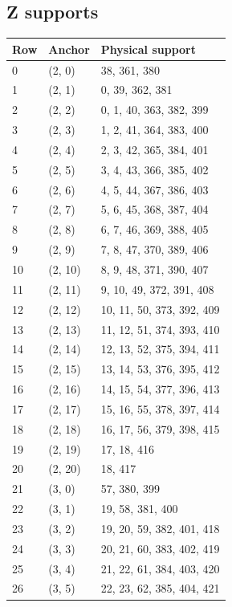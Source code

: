 \documentclass{article}
\begin{document}
\subsection{Z supports}\label{sec:z-supports}

\begin{longtable}{lll}
  Row & Anchor & Physical support \\
  \hline
  \endhead
  0 & (2, 0) & 38, 361, 380 \\
  1 & (2, 1) & 0, 39, 362, 381 \\
  2 & (2, 2) & 0, 1, 40, 363, 382, 399 \\
  3 & (2, 3) & 1, 2, 41, 364, 383, 400 \\
  4 & (2, 4) & 2, 3, 42, 365, 384, 401 \\
  5 & (2, 5) & 3, 4, 43, 366, 385, 402 \\
  6 & (2, 6) & 4, 5, 44, 367, 386, 403 \\
  7 & (2, 7) & 5, 6, 45, 368, 387, 404 \\
  8 & (2, 8) & 6, 7, 46, 369, 388, 405 \\
  9 & (2, 9) & 7, 8, 47, 370, 389, 406 \\
  10 & (2, 10) & 8, 9, 48, 371, 390, 407 \\
  11 & (2, 11) & 9, 10, 49, 372, 391, 408 \\
  12 & (2, 12) & 10, 11, 50, 373, 392, 409 \\
  13 & (2, 13) & 11, 12, 51, 374, 393, 410 \\
  14 & (2, 14) & 12, 13, 52, 375, 394, 411 \\
  15 & (2, 15) & 13, 14, 53, 376, 395, 412 \\
  16 & (2, 16) & 14, 15, 54, 377, 396, 413 \\
  17 & (2, 17) & 15, 16, 55, 378, 397, 414 \\
  18 & (2, 18) & 16, 17, 56, 379, 398, 415 \\
  19 & (2, 19) & 17, 18, 416 \\
  20 & (2, 20) & 18, 417 \\
  21 & (3, 0) & 57, 380, 399 \\
  22 & (3, 1) & 19, 58, 381, 400 \\
  23 & (3, 2) & 19, 20, 59, 382, 401, 418 \\
  24 & (3, 3) & 20, 21, 60, 383, 402, 419 \\
  25 & (3, 4) & 21, 22, 61, 384, 403, 420 \\
  26 & (3, 5) & 22, 23, 62, 385, 404, 421 \\

\end{longtable}
\end{document}
